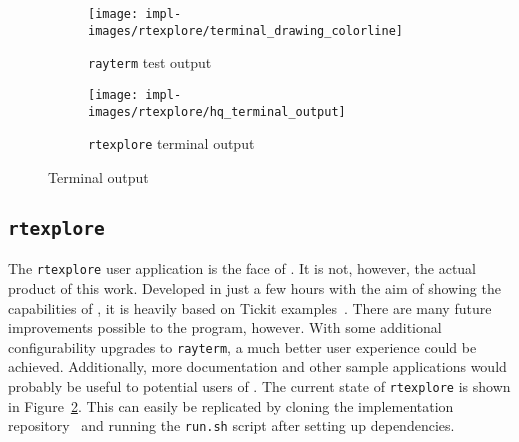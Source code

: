 \vspace{0.3em}
\begin{figure}[htb]
  \centering
  \begin{subfigure}[htb]{0.48\textwidth}
    \texttt{[image: impl-images/rtexplore/terminal\_drawing\_colorline]}
    \caption{\texttt{rayterm} test output}
\label{fig:terminal_colorline}
  \end{subfigure}
  \begin{subfigure}[htb]{0.48\textwidth}
    \texttt{[image: impl-images/rtexplore/hq\_terminal\_output]}
    \caption{\texttt{rtexplore} terminal output}
\label{fig:rtexplore_terminal}
  \end{subfigure}
  \caption{Terminal output}
\label{fig:rayterm_terminal_output}
\end{figure}

\subsection{\texttt{rtexplore}}\label{ch:implementation:final:rtexplore}

The \texttt{rtexplore} user application is the face of \name{}.
It is not, however, the actual product of this work.
Developed in just a few hours with the aim of showing the capabilities of \name{}, it is heavily based on Tickit examples~\cite{libtickitLibrary}.
There are many future improvements possible to the program, however.
With some additional configurability upgrades to \texttt{rayterm}, a much better user experience could be achieved.
Additionally, more documentation and other sample applications would probably be useful to potential users of \name{}.
The current state of \texttt{rtexplore} is shown in Figure~\ref{fig:rtexplore_terminal}.
This can easily be replicated by cloning the \name{} implementation repository~\cite{raytermGpuImpl} and running the \texttt{run.sh} script after setting up dependencies.

